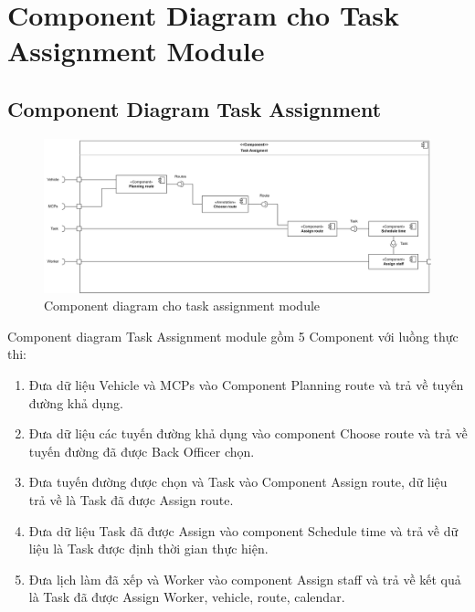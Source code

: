 \section{Component Diagram cho Task Assignment Module}
    \subsection{Component Diagram Task Assignment}
         \begin{figure}[h]
            \centering
            \includegraphics[width=1\linewidth]{imgs/component diagram/component Task Assignment.png}
            \caption{Component diagram cho task assignment module}
        \end{figure}
        Component diagram Task Assignment module gồm 5 Component với luồng thực thi:
        \begin{enumerate}
            \item Đưa dữ liệu Vehicle và MCPs vào Component Planning route và trả về tuyến đường khả dụng.
            \item Đưa dữ liệu các tuyến đường khả dụng vào component Choose route và trả về tuyến đường đã được Back Officer chọn.
            \item Đưa tuyến đường được chọn và Task vào Component Assign route, dữ liệu trả về là Task đã được Assign route.
            \item Đưa dữ liệu Task đã được Assign vào component Schedule time và trả về dữ liệu là Task được định thời gian thực hiện.
            \item Đưa lịch làm đã xếp và Worker vào component Assign staff và trả về kết quả là Task đã được Assign Worker, vehicle, route, calendar.
        \end{enumerate}
